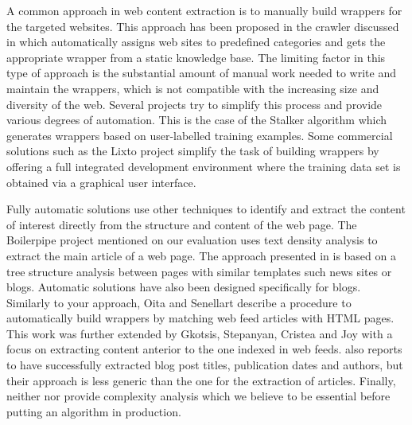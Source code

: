 A common approach in web content extraction is to manually build wrappers for the targeted websites. This approach has been proposed in the crawler discussed in \cite{faheem2012intelligent} which automatically assigns web sites to predefined categories and gets the appropriate wrapper from a static knowledge base. The limiting factor in this type of approach is the substantial amount of manual work needed to write and maintain the wrappers, which is not compatible with the increasing size and diversity of the web. Several projects try to simplify this process and provide various degrees of automation. This is the case of the Stalker algorithm \cite{stalker} which generates wrappers based on user-labelled training examples. Some commercial solutions such as the Lixto project \cite{lixto} simplify the task of building wrappers by offering a full integrated development environment where the training data set is obtained via a graphical user interface.

Fully automatic solutions use other techniques to identify and extract the content of interest directly from the structure and content of the web page. The Boilerpipe project \cite{kohlschuetter2010} mentioned on our evaluation uses text density analysis to extract the main article of a web page. The approach presented in \cite{treeedit} is based on a tree structure analysis between pages with similar templates such news sites or blogs. Automatic solutions have also been designed specifically for blogs. Similarly to your approach, Oita and Senellart \cite{oita2010} describe a procedure to automatically build wrappers by matching web feed articles with HTML pages. This work was further extended by Gkotsis, Stepanyan, Cristea and Joy \cite{gkotsis2013} with a focus on extracting content anterior to the one indexed in web feeds. \cite{gkotsis2013} also reports to have successfully extracted blog post titles, publication dates and authors, but their approach is less generic than the one for the extraction of articles. Finally, neither \cite{oita2010} nor \cite{gkotsis2013} provide complexity analysis which we believe to be essential before putting an algorithm in production.

